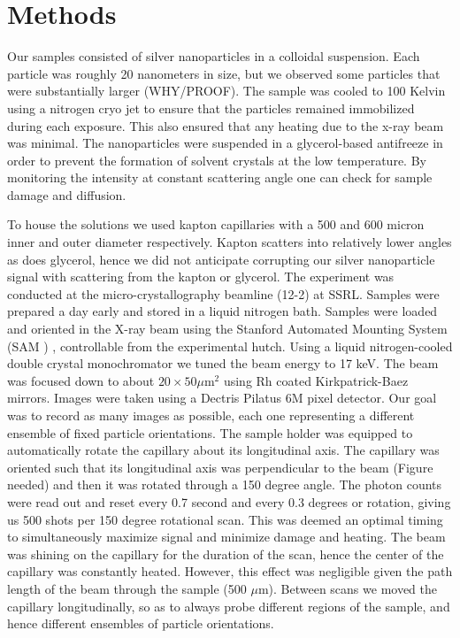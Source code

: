 \documentclass [11pt,fleqn]{article}
\begin{document}
\section{Methods}
Our samples consisted of silver nanoparticles in a colloidal suspension. Each particle was roughly 20
nanometers in size, but we observed some particles that were substantially larger (WHY/PROOF).
The sample was cooled to 100 Kelvin using a nitrogen cryo jet to ensure that the particles remained immobilized during each exposure. This also ensured that  any heating due to the x-ray beam was minimal. The nanoparticles were suspended in a glycerol-based antifreeze
in order to prevent the formation of solvent crystals at the low temperature. By
monitoring the intensity at constant scattering angle one can check for sample
damage and diffusion.

To house the solutions we used kapton capillaries with a 500 and 600 micron inner
and outer diameter respectively. Kapton scatters into relatively lower angles as
does glycerol, hence we did not anticipate corrupting our silver nanoparticle signal with scattering from the kapton or glycerol.  The experiment was conducted at the micro-crystallography beamline (12-2) at
SSRL. Samples were prepared a day early and stored in a liquid nitrogen bath.
Samples were loaded and oriented in the X-ray beam using the Stanford Automated Mounting System (SAM ) , controllable from the experimental hutch.
Using a liquid nitrogen-cooled double crystal monochromator we tuned the beam
energy to 17 keV. The beam was focused down to about $20 \times 50 \mu$m$^2$ using Rh
coated Kirkpatrick-Baez mirrors.
Images were taken using a Dectris Pilatus 6M pixel detector. Our goal was to record as many images as possible, each one representing a different ensemble of
fixed particle orientations. The sample holder was equipped to automatically 
rotate the capillary about its longitudinal axis. The capillary was oriented such that
its longitudinal axis was perpendicular to the beam (Figure needed) and then it
was rotated through a 150 degree angle. The photon counts were read out and
reset every 0.7 second and every 0.3 degrees or rotation, giving us 500 shots per
150 degree rotational scan. This was deemed an optimal timing to simultaneously
maximize signal and minimize damage and heating. The beam was shining on
the capillary for the duration of the scan, hence the center of the capillary was
constantly heated. However, this effect was negligible given the path length of
the beam through the sample (500 $\mu$m). Between scans we moved the capillary
longitudinally, so as to always probe different regions of the sample, and hence
different ensembles of particle orientations.
\end{document}
